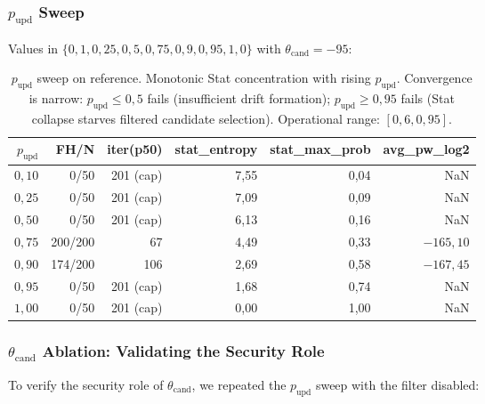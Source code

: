 \documentclass[11pt,a4paper]{article}
\begin{document}
\subsubsection{$p_\text{upd}$ Sweep}\label{sec:empirical-pupd}

Values in $\{0{,}1, 0{,}25, 0{,}5, 0{,}75, 0{,}9, 0{,}95, 1{,}0\}$ with $\theta_{\text{cand}} = -95$:

\begin{table}[ht]
\centering
\small
\begin{tabular}{rrrrrr}
\toprule
$p_\text{upd}$ & FH/N & iter(p50) & stat\_entropy & stat\_max\_prob & avg\_pw\_log2 \\
\midrule
$0{,}10$ & 0/50 & 201 (cap) & 7{,}55 & 0{,}04 & NaN \\
$0{,}25$ & 0/50 & 201 (cap) & 7{,}09 & 0{,}09 & NaN \\
$0{,}50$ & 0/50 & 201 (cap) & 6{,}13 & 0{,}16 & NaN \\
$0{,}75$ & 200/200 & 67 & 4{,}49 & 0{,}33 & $-165{,}10$ \\
$0{,}90$ & 174/200 & 106 & 2{,}69 & 0{,}58 & $-167{,}45$ \\
$0{,}95$ & 0/50 & 201 (cap) & 1{,}68 & 0{,}74 & NaN \\
$1{,}00$ & 0/50 & 201 (cap) & 0{,}00 & 1{,}00 & NaN \\
\bottomrule
\end{tabular}
\caption{$p_\text{upd}$ sweep on reference. Monotonic Stat concentration with rising $p_\text{upd}$. Convergence is narrow: $p_\text{upd} \leq 0{,}5$ fails (insufficient drift formation); $p_\text{upd} \geq 0{,}95$ fails (Stat collapse starves filtered candidate selection). Operational range: $[0{,}6, 0{,}95]$.}
\label{tab:pupd-sweep}
\end{table}

\subsubsection{$\theta_{\text{cand}}$ Ablation: Validating the Security Role}\label{sec:empirical-pupd-ablation}

To verify the security role of $\theta_{\text{cand}}$, we repeated the $p_\text{upd}$ sweep with the filter disabled:
\end{document}
